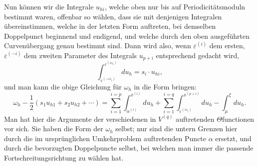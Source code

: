 \documentclass[10pt]{article}
\begin{document}
Nun können wir die Integrale \(u_{hi}\), welche oben nur bis auf Periodicitätsmoduln bestimmt waren, offenbar so wählen, dass sie mit denjenigen Integralen übereinstimmen, welche in der letzten Form auftreten, bei demselben Doppelpunct beginnend und endigend, und welche durch den oben ausgeführten Curvenübergang genau bestimmt sind. Dann wird also, wenn \(\varepsilon^{(i)}\) dem ersten, \(\varepsilon^{(-i)}\) dem zweiten Parameter des Integrals \(u_{p+i}\) entsprechend gedacht wird,
\[
\int_{\varepsilon^{(-is_i)}}^{\varepsilon^{(is_i)}}du_h=s_i\cdot u_{hi},
\]
und man kann die obige Gleichung für \(\omega_h\) in die Form bringen:
\[
\omega_h-\frac12(s_1u_{h1}+s_2u_{h2}+\cdots)
=\sum_{i=1}^{i=p}\int_{\alpha^{(i)}}^{x^{(i)}}du_h
+\sum_{i=1}^{i=q}\int_{\varepsilon^{(is_i)}}^{x^{(p+i)}}du_h-\int_{\mu}^{\xi}du_h.
\]
Man hat hier die Argumente der verschiedenen in \(V^{(q)}\) auftretenden \(\Theta\)functionen vor sich. Sie haben die Form der \(\omega_h\) selbst; nur sind die untern Grenzen hier durch die im ursprünglichen Umkehrproblem auftretenden Puncte \(\alpha\) ersetzt, und durch die bevorzugten Doppelpuncte selbst, bei welchen man immer die passende Fortschreitungsrichtung zu wählen hat.
\end{document}
